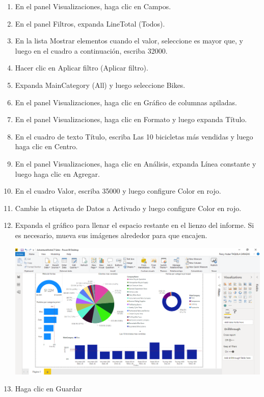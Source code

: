 \documentclass[12pt,letterpaper]{article}
\begin{document}
\begin{enumerate}
    
 \item En el panel Visualizaciones, haga clic en Campos.
    \item En el panel Filtros, expanda LineTotal (Todos).
    \item En la lista Mostrar elementos cuando el valor, seleccione es mayor que, y luego en el cuadro a continuación, escriba 32000.


    \item Hacer clic en Aplicar filtro (Aplicar filtro).
    \item Expanda MainCategory (All) y luego seleccione Bikes.  
    \item En el panel Visualizaciones, haga clic en Gráfico de columnas apiladas.   
    
    
    
      \item En el panel Visualizaciones, haga clic en Formato y luego expanda Título.
    \item En el cuadro de texto Título, escriba Las 10 bicicletas más vendidas y luego haga clic en Centro.


    \item En el panel Visualizaciones, haga clic en Análisis, expanda Línea constante y luego haga clic en Agregar.
    \item En el cuadro Valor, escriba 35000 y luego configure Color en rojo.  
    \item Cambie la etiqueta de Datos a Activado y luego configure Color en rojo.
    
       \item Expanda el gráfico para llenar el espacio restante en el lienzo del informe. Si es necesario, mueva sus imágenes alrededor para que encajen.  
           \begin{center}
	\includegraphics[width=13cm]{./Imagenes/12}
	\end{center}
       
       
       
    \item Haga clic en Guardar
    
    
    


\end{enumerate}
\end{document}
